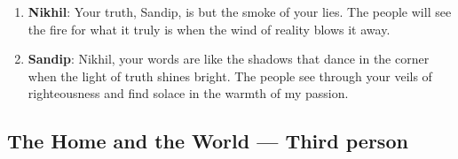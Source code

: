 \documentclass[10pt]{article}
\begin{document}
\begin{enumerate}
\item \textbf{Nikhil}: Your truth, Sandip, is but the smoke of your lies. The people will see the fire for what it truly is when the wind of reality blows it away.

\item \textbf{Sandip}: Nikhil, your words are like the shadows that dance in the corner when the light of truth shines bright. The people see through your veils of righteousness and find solace in the warmth of my passion.

\end{enumerate}

\subsection*{The Home and the World --- Third person}
\end{document}

